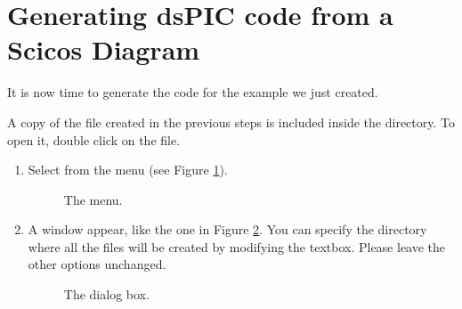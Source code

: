 \section{Generating dsPIC code from a Scicos Diagram}
\label{sec:codegen}

It is now time to generate the code for the example we just created.

\begin{note}
  A copy of the file created in the previous steps is included inside the
   directory. To open it, double click
  on the  file.
\end{note}

\begin{enumerate}
\item
  Select  from the  menu (see Figure
  \ref{fig:codegen1}).
%
\begin{figure}[htb]
\caption{The  menu.}
\label{fig:codegen1}
\end{figure}

\item
  A window appear, like the one in Figure \ref{fig:codegen2}. You can
  specify the directory where all the files will be created by
  modifying the  textbox. Please leave the
  other options unchanged.
%
\begin{figure}[htb]
\caption{The  dialog box.}
\label{fig:codegen2}
\end{figure}


\end{enumerate}
